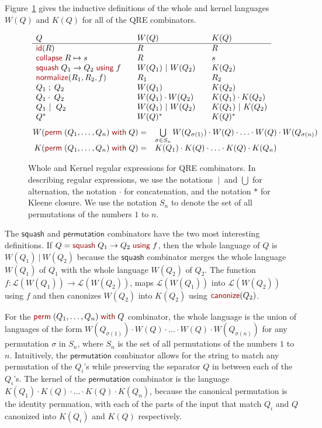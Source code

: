 \documentclass[acmsmall,review,anonymous]{acmart}
\newcommand{\kw}[1]{\textcolor{dkred}{\ensuremath{\mathsf{#1}}}}
\newcommand{\collapse}[2]{\ensuremath{\kw{collapse} \; #1 \mapsto #2}}
\newcommand{\squash}[3]{\ensuremath{\kw{squash} \; #1 \rightarrow #2\; \kw{using} \; #3}}
\newcommand{\perm}[2]{\ensuremath{\kw{perm}\; (#1)\; \kw{with}\; #2}}
\newcommand{\normalize}[3]{\ensuremath{\kw{normalize}(#1, #2, #3)}}
\newcommand{\sep}{\ensuremath{\ | \ }}
\newcommand{\canonize}{\ensuremath{\kw{canonize}}}
\newcommand{\id}{\ensuremath{\kw{id}}}
\begin{document}
Figure~\ref{fig:wk} gives the inductive definitions of the whole and
kernel languages $W(Q)$ and $K(Q)$ for all of the QRE combinators.
\begin{figure}[t]
\centering
\[
\begin{array}{l@{\quad\quad}l@{\quad\quad}l}

Q & W(Q) & K(Q) \\ \hline
\id(R) & R & R \\
\collapse{R}{s} & R & s \\
\squash{Q_1}{Q_2}{f} & W(Q_1) \sep W(Q_2) & K(Q_2) \\
\normalize{R_1}{R_2}{f} & R_1 & R_2 \\
Q_1 \; ; \; Q_2 & W(Q_1) & K(Q_2) \\
Q_1 \cdot\; Q_2 & W(Q_1) \cdot W(Q_2) & K(Q_1) \cdot K(Q_2) \\
Q_1 \sep \; Q_2 & W(Q_1) \sep W(Q_2) & K(Q_1) \sep K(Q_2) \\
Q^* & W(Q)^* & K(Q)^* \\
\end{array}
\]
\[
\begin{array}{r@{\quad}l}
W( \perm{Q_1, \ldots, Q_n}{Q} ) = &
\bigcup \limits_{\sigma \in S_n} W(Q_{\sigma(1)}) \cdot W(Q) \cdot \ldots \cdot
W(Q) \cdot W(Q_{\sigma(n)})\\
K( \perm{Q_1, \ldots, Q_n}{Q} ) = & K(Q_1) \cdot K(Q) \cdot \ldots \cdot K(Q)
\cdot K(Q_n)
\end{array}
\]
\caption{Whole and Kernel regular expressions for QRE combinators. 
In describing regular expressions, we use the notations $\sep$ and $\bigcup$ for
alternation, the notation $\cdot$ for concatenation, and the notation
$*$ for Kleene closure.  
We use the notation $S_n$ to denote the set of all permutations of the
numbers $1$ to $n$.
}
\label{fig:wk}
\end{figure}
The \kw{squash} and \kw{permutation} combinators have the two most
interesting definitions. If $Q = \squash{Q_1}{Q_2}{f}$, then the whole language
of $Q$ is $W(Q_1) \sep W(Q_2)$ because the \kw{squash} combinator
merges the whole language $W(Q_1)$ of $Q_1$ with the whole language $W(Q_2)$ of $Q_2$.
The function $f : \mathcal{L}(W(Q_1)) \longrightarrow \mathcal{L}(W(Q_2))$,
maps $\mathcal{L}(W(Q_1))$ into $\mathcal{L}(W(Q_2))$ using $f$ and then
canonizes $W(Q_2)$ into $K(Q_2)$ using $\canonize(Q_2)$.

For the $\perm{Q_1, \ldots, Q_n}{Q}$ combinator, the whole language is the
union of languages of the form $W(Q_{\sigma(1)}) \cdot W(Q) \cdot \ldots \cdot
W(Q) \cdot W(Q_{\sigma(n)})$ for any permutation $\sigma$ in $S_n$, where
$S_n$ is the set of all permutations of the numbers $1$ to $n$. Intuitively,
the \kw{permutation} combinator allows for the string to match any
permutation of the $Q_i$'s while preserving the separator $Q$ in
between each of the $Q_i$'s. The kernel of the \kw{permutation} combinator
is the language $K(Q_1) \cdot K(Q) \cdot \ldots \cdot K(Q) \cdot K(Q_n)$,
because the canonical permutation is the identity permuation, with each of the
parts of the input that match $Q_i$ and $Q$ canonized into $K(Q_i)$ and $K(Q)$
respectively.
\end{document}
